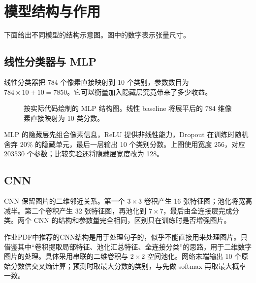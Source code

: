 \documentclass[11pt,a4paper]{ctexart}
\begin{document}
\section{模型结构与作用}
下面给出不同模型的结构示意图。图中的数字表示张量尺寸。

\subsection{线性分类器与 MLP}
线性分类器把 784 个像素直接映射到 10 个类别，参数数目为 $784\times10+10=7850$。它可以衡量加入隐藏层究竟带来了多少收益。

\begin{figure}[htbp]
\centering
{}
\caption{按实际代码绘制的 MLP 结构图。线性 baseline 将展平后的 784 维像素直接映射为 10 类分数。}
\end{figure}

MLP 的隐藏层先组合像素信息，ReLU 提供非线性能力，Dropout 在训练时随机舍弃 20\% 的隐藏单元，最后一层输出 10 个类别分数。上图使用宽度 256，对应 203530 个参数；比较实验还将隐藏层宽度改为 128。

\subsection{CNN}
CNN 保留图片的二维邻近关系。第一个 $3\times3$ 卷积产生 16 张特征图；池化将宽高减半。第二个卷积产生 32 张特征图，再池化到 $7\times7$，最后由全连接层完成分类。两个 CNN 的结构和参数量完全相同，区别只在训练时是否增强图片。

作业PDF中推荐的CNN结构是用于处理句子的，似乎不能直接用来处理图片。只借鉴其中“卷积提取局部特征、池化汇总特征、全连接分类”的思路，用于二维数字图片的处理。具体采用串联的二维卷积与 $2\times2$ 空间池化。网络末端输出 10 个原始分数供交叉熵计算；预测时取最大分数的类别，与先做 softmax 再取最大概率一致。
\end{document}
